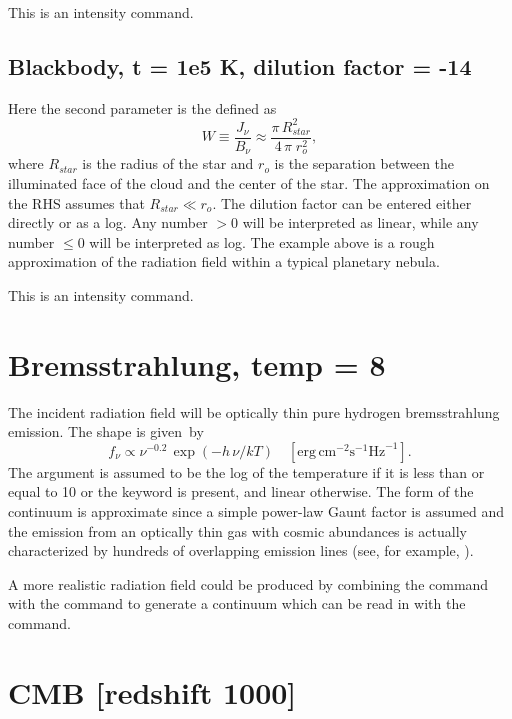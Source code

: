 This is an intensity command.

\subsection{Blackbody, t = 1e5 K, dilution factor = -14}

Here the second parameter is the 
 defined as
\begin{equation}
W \equiv \frac{{J_\nu  }}{{B_\nu  }} \approx \frac{{\pi \,R_{star}^2
}}{{4\,\pi \;r_o^2 }},%
\end{equation}
where $R_{star}$ is the radius of the star and $r_o$ is the separation
between the illuminated face of the cloud and the center of the star.
The approximation
on the RHS assumes that $R_{star} \ll r_o$.
The dilution factor can be entered
either directly or as a log. Any number $> 0$ will be interpreted as
linear, while any number $\leq 0$ will be interpreted as log.
The example above is a rough approximation of the radiation field within
a typical planetary nebula.

This is an intensity command.

\section{Bremsstrahlung, temp = 8}

The incident radiation field will be optically thin pure hydrogen bremsstrahlung
emission.
The shape is given~by
\begin{equation}
f_\nu   \propto \nu ^{ - 0.2} \,\exp \left( { - h\,\nu /kT} \right)\quad
[\mathrm{erg\, cm}^{-2} \mathrm{s}^{-1} \mathrm{Hz}^{-1}]. %
\end{equation}
The argument is assumed to be the log of the temperature if it is
less than or equal to 10 or the keyword  is present, and linear otherwise.
The form of the continuum is
approximate since a simple power-law Gaunt factor is assumed and
the emission
from an optically thin gas with cosmic abundances is
actually characterized
by hundreds of overlapping emission lines (see, for example, \citealp{Kato1976}).

A more realistic radiation field could be produced by combining the
 command with the
 command
to generate a continuum which can be read in with
the  command.

\section{CMB [redshift 1000]}

